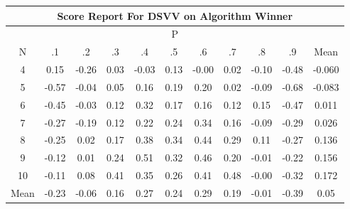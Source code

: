 \documentclass[11pt,a4paper]{report}
\begin{document}
\begin{longtable}{ | c || c | c | c | c | c | c | c | c | c || c |}
\hline
\multicolumn{11}{|c|}{ Score Report For DSVV on Algorithm Winner} \\
\hline
\multicolumn{11}{|c|}{ P } \\
\hline
N & .1 & .2 & .3 & .4 & .5 & .6 & .7 & .8 & .9 & Mean\\
 \hline
 \hline
 \endhead
  4 &  \cellcolor[HTML]{FFFFFF} 0.15 &  \cellcolor[HTML]{FFF7F7} -0.26 &  \cellcolor[HTML]{FFFFFF} 0.03 &  \cellcolor[HTML]{FFFFFF} -0.03 &  \cellcolor[HTML]{FFFFFF} 0.13 &  \cellcolor[HTML]{FFFFFF} -0.00 &  \cellcolor[HTML]{FFFFFF} 0.02 &  \cellcolor[HTML]{FFFFFF} -0.10 &  \cellcolor[HTML]{FFEFEF} -0.48 & -0.060 \\
  5 &  \cellcolor[HTML]{FFEFEF} -0.57 &  \cellcolor[HTML]{FFFFFF} -0.04 &  \cellcolor[HTML]{FFFFFF} 0.05 &  \cellcolor[HTML]{F7F7FF} 0.16 &  \cellcolor[HTML]{F7F7FF} 0.19 &  \cellcolor[HTML]{F7F7FF} 0.20 &  \cellcolor[HTML]{FFFFFF} 0.02 &  \cellcolor[HTML]{FFFFFF} -0.09 &  \cellcolor[HTML]{FFEFEF} -0.68 & -0.083 \\
  6 &  \cellcolor[HTML]{FFF7F7} -0.45 &  \cellcolor[HTML]{FFFFFF} -0.03 &  \cellcolor[HTML]{FFFFFF} 0.12 &  \cellcolor[HTML]{F7F7FF} 0.32 &  \cellcolor[HTML]{F7F7FF} 0.17 &  \cellcolor[HTML]{F7F7FF} 0.16 &  \cellcolor[HTML]{FFFFFF} 0.12 &  \cellcolor[HTML]{FFFFFF} 0.15 &  \cellcolor[HTML]{FFF7F7} -0.47 & 0.011 \\
  7 &  \cellcolor[HTML]{FFF7F7} -0.27 &  \cellcolor[HTML]{FFF7F7} -0.19 &  \cellcolor[HTML]{FFFFFF} 0.12 &  \cellcolor[HTML]{F7F7FF} 0.22 &  \cellcolor[HTML]{F7F7FF} 0.24 &  \cellcolor[HTML]{F7F7FF} 0.34 &  \cellcolor[HTML]{F7F7FF} 0.16 &  \cellcolor[HTML]{FFFFFF} -0.09 &  \cellcolor[HTML]{FFF7F7} -0.29 & 0.026 \\
  8 &  \cellcolor[HTML]{FFF7F7} -0.25 &  \cellcolor[HTML]{FFFFFF} 0.02 &  \cellcolor[HTML]{F7F7FF} 0.17 &  \cellcolor[HTML]{F7F7FF} 0.38 &  \cellcolor[HTML]{F7F7FF} 0.34 &  \cellcolor[HTML]{F7F7FF} 0.44 &  \cellcolor[HTML]{F7F7FF} 0.29 &  \cellcolor[HTML]{FFFFFF} 0.11 &  \cellcolor[HTML]{FFF7F7} -0.27 & 0.136 \\
  9 &  \cellcolor[HTML]{FFFFFF} -0.12 &  \cellcolor[HTML]{FFFFFF} 0.01 &  \cellcolor[HTML]{F7F7FF} 0.24 &  \cellcolor[HTML]{EFEFFF} 0.51 &  \cellcolor[HTML]{F7F7FF} 0.32 &  \cellcolor[HTML]{F7F7FF} 0.46 &  \cellcolor[HTML]{F7F7FF} 0.20 &  \cellcolor[HTML]{FFFFFF} -0.01 &  \cellcolor[HTML]{FFF7F7} -0.22 & 0.156 \\
  10 &  \cellcolor[HTML]{FFFFFF} -0.11 &  \cellcolor[HTML]{FFFFFF} 0.08 &  \cellcolor[HTML]{F7F7FF} 0.41 &  \cellcolor[HTML]{F7F7FF} 0.35 &  \cellcolor[HTML]{F7F7FF} 0.26 &  \cellcolor[HTML]{F7F7FF} 0.41 &  \cellcolor[HTML]{EFEFFF} 0.48 &  \cellcolor[HTML]{FFFFFF} -0.00 &  \cellcolor[HTML]{FFF7F7} -0.32 & 0.172 \\
 \hline
 \hline
Mean &  \cellcolor[HTML]{FFF7F7} -0.23 &  \cellcolor[HTML]{FFFFFF} -0.06 &  \cellcolor[HTML]{F7F7FF} 0.16 &  \cellcolor[HTML]{F7F7FF} 0.27 &  \cellcolor[HTML]{F7F7FF} 0.24 &  \cellcolor[HTML]{F7F7FF} 0.29 &  \cellcolor[HTML]{F7F7FF} 0.19 &  \cellcolor[HTML]{FFFFFF} -0.01 &  \cellcolor[HTML]{FFF7F7} -0.39 &  \cellcolor[HTML]{FFFFFF} 0.05
\end{longtable}
\end{document}
